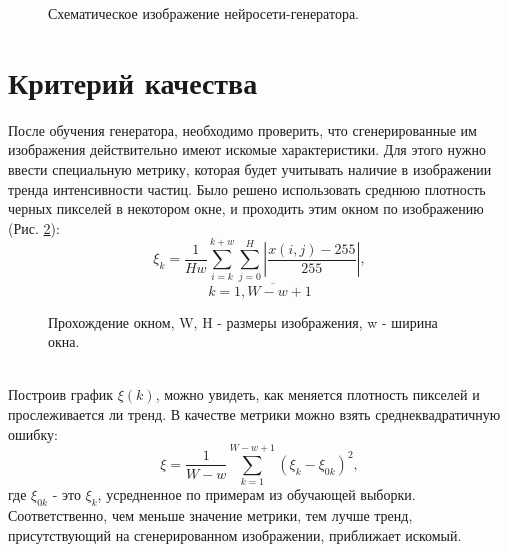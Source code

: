 \documentclass[a4paper]{article}
\begin{document}
		\begin{figure}
			\caption{Схематическое изображение нейросети-генератора.}
			\label{unet-sheme}
		\end{figure}
	\section{Критерий качества}
		После обучения генератора, необходимо проверить, что сгенерированные им изображения действительно имеют искомые характеристики. Для этого нужно ввести специальную метрику, которая будет учитывать наличие в изображении тренда интенсивности частиц. Было решено использовать среднюю плотность черных пикселей в некотором окне, и проходить этим окном по изображению (Рис. \ref{window}):
		\newpage
		$$\xi_k = \frac{1}{H w}{\sum_{i=k}^{k+w} \sum_{j=0}^{H}\left| \frac{x(i, j) - 255}{255} \right|}, $$$$k = \overline{1, W - w + 1} $$
		\begin{figure}
			\caption{Прохождение окном, W, H - размеры изображения, w - ширина окна.}
			\label{window}
		\end{figure}
		\\
		Построив график $\xi(k)$, можно увидеть, как меняется плотность пикселей и прослеживается ли тренд. В качестве метрики можно взять среднеквадратичную ошибку:
		$$ \xi = \frac{1}{W-w}\sum_{k=1}^{W-w+1} (\xi_k - \xi_{0k})^2,$$
		где $\xi_{0k}$ - это $\xi_k$, усредненное по примерам из обучающей выборки. Соответственно, чем меньше значение метрики, тем лучше тренд, присутствующий на сгенерированном изображении, приближает искомый.
\end{document}
